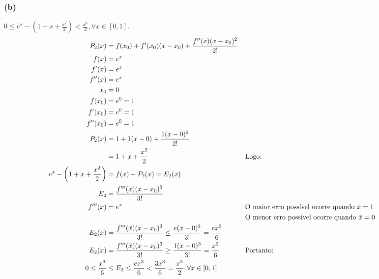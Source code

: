 \documentclass{article}
\begin{document}
\subsubsection{(b)}
$0
\leq e^x - \left(1 + x + \frac{x^2}{2}\right)
< \frac{x^3}{2}, \forall x \in [0, 1]$.
\begin{align}
  P_2(x)
  &= f(x_0) + f'(x_0)(x - x_0) + \frac{f''(x)(x - x_0)^2}{2!} \\
  f(x)
  &= e^x \\
  f'(x)
  &= e^x \\
  f''(x)
  &= e^x \\
  x_0
  &= 0 \\
  f(x_0)
  &= e^0
  = 1 \\
  f'(x_0)
  &= e^0
  = 1 \\
  f''(x_0)
  &= e^0
  = 1 \\
  P_2(x)
  &= 1 + 1(x - 0) + \frac{1(x - 0)^2}{2!} \\
  &= 1 + x + \frac{x^2}{2}
  && \text{Logo:} \notag \\
  e^x - \left(1 + x + \frac{x^2}{2}\right)
  &= f(x) - P_2(x)
  = E_2(x) \\
  E_2
  &= \frac{f'''(\bar{x}) (x - x_0)^3}{3!} \\
  f'''(x)
  &= e^x
  && \text{O maior erro possível ocorre quando $\bar{x} = 1$} \\
  & && \text{O menor erro possível ocorre quando $\bar{x} = 0$} \notag \\
  E_2(x)
  &= \frac{f'''(\bar{x}) (x - x_0)^3}{3!}
  \leq \frac{e(x - 0)^3}{3!}
  = \frac{ex^3}{6} \\
  E_2(x)
  &= \frac{f'''(\bar{x}) (x - x_0)^3}{3!}
  \geq \frac{1(x - 0)^3}{3!}
  = \frac{x^3}{6}
  && \text{Portanto:} \\
  0 \leq \frac{x^3}{6}
  &\leq E_2 \leq \frac{ex^3}{6}
  < \frac{3x^3}{6} = \frac{x^3}{2}, \forall x \in [0,1]
\end{align}
\setcounter{equation}{0}
\clearpage
\end{document}
